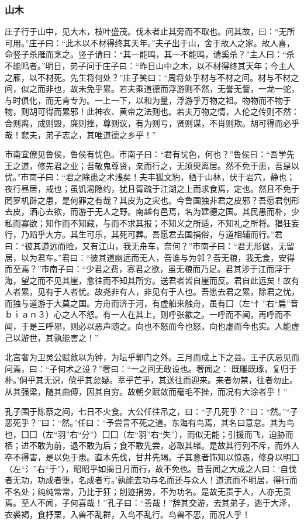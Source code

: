 \documentclass[]{article}
\begin{document}
\hypertarget{header-n334}{%
\subsubsection{山木}\label{header-n334}}

庄子行于山中，见大木，枝叶盛茂。伐木者止其旁而不取也。问其故，曰：``无所可用。''庄子曰：``此木以不材得终其天年。''夫子出于山，舍于故人之家。故人喜，命竖子杀雁而烹之。竖子请曰：``其一能鸣，其一不能鸣，请奚杀？''主人曰：``杀不能鸣者。''明日，弟子问于庄子曰：``昨日山中之木，以不材得终其天年；今主人之雁，以不材死。先生将何处？''庄子笑曰：``周将处乎材与不材之间。材与不材之间，似之而非也，故未免乎累。若夫乘道德而浮游则不然，无誉无訾，一龙一蛇，与时俱化，而无肯专为。一上一下，以和为量，浮游乎万物之祖。物物而不物于物，则胡可得而累邪！此神农、黄帝之法则也。若夫万物之情，人伦之传则不然：合则离，成则毁，廉则挫，尊则议，有为则亏，贤则谋，不肖则欺。胡可得而必乎哉！悲夫，弟子志之，其唯道德之乡乎！''

市南宜僚见鲁侯，鲁侯有忧色。市南子曰：``君有忧色，何也？''鲁侯曰：``吾学先王之道，修先君之业；吾敬鬼尊贤，亲而行之，无须臾离居。然不免于患，吾是以忧。''市南子曰：``君之除患之术浅矣！夫丰狐文豹，栖于山林，伏于岩穴，静也；夜行昼居，戒也；虽饥渴隐约，犹且胥疏于江湖之上而求食焉，定也。然且不免于罔罗机辟之患，是何罪之有哉？其皮为之灾也。今鲁国独非君之皮邪？吾愿君刳形去皮，洒心去欲，而游于无人之野。南越有邑焉，名为建德之国。其民愚而朴，少私而寡欲；知作而不知藏，与而不求其报；不知义之所适，不知礼之所将。猖狂妄行，乃蹈乎大方。其生可乐，其死可葬。吾愿君去国捐俗，与道相辅而行。''君曰：``彼其道远而险，又有江山，我无舟车，奈何？''市南子曰：``君无形倨，无留居，以为君车。''君曰：``彼其道幽远而无人，吾谁与为邻？吾无粮，我无食，安得而至焉？''市南子曰：``少君之费，寡君之欲，虽无粮而乃足。君其涉于江而浮于海，望之而不见其崖，愈往而不知其所穷。送君者皆自崖而反。君自此远矣！故有人者累，见有于人者忧。故尧非有人，非见有于人也。吾愿去君之累，除君之忧，而独与道游于大莫之国。方舟而济于河，有虚船来触舟，虽有囗（左``忄''右``扁''音ｂｉａｎ３）心之人不怒。有一人在其上，则呼张歙之。一呼而不闻，再呼而不闻，于是三呼邪，则必以恶声随之。向也不怒而今也怒，向也虚而今也实。人能虚己以游世，其孰能害之！''

北宫奢为卫灵公赋敛以为钟，为坛乎郭门之外。三月而成上下之县。王子庆忌见而问焉，曰：``子何术之设？''奢曰：``一之间无敢设也。奢闻之：`既雕既琢，复归于朴。'侗乎其无识，傥乎其怠疑。萃乎芒乎，其送往而迎来。来者勿禁，往者勿止。从其强梁，随其曲傅，因其自穷。故朝夕赋敛而毫毛不挫，而况有大涂者乎！''

孔子围于陈蔡之间，七日不火食。大公任往吊之，曰：``子几死乎？''曰：``然。''``子恶死乎？''曰：``然。''任曰：``予尝言不死之道。东海有鸟焉，其名曰意怠。其为鸟也，囗囗（左``羽''右``分''）囗囗（左``羽''右``失''），而似无能；引援而飞，迫胁而栖；进不敢为前，退不敢为后；食不敢先尝，必取其绪。是故其行列不斥，而外人卒不得害，是以免于患。直木先伐，甘井先竭。子其意者饰知以惊愚，修身以明囗（左``氵''右``于''），昭昭乎如揭日月而行，故不免也。昔吾闻之大成之人曰：`自伐者无功，功成者堕，名成者亏。'孰能去功与名而还与众人！道流而不明居，得行而不名处；纯纯常常，乃比于狂；削迹捐势，不为功名。是故无责于人，人亦无责焉。至人不闻，子何喜哉！''孔子曰：``善哉！''辞其交游，去其弟子，逃于大泽，衣裘褐，食杼栗，入兽不乱群，入鸟不乱行。鸟兽不恶，而况人乎！
\end{document}
